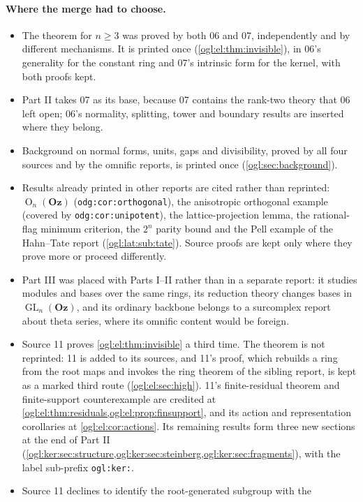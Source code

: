 \documentclass[11pt,oneside]{article}
\numberwithin{equation}{section}
\theoremstyle{definition}
\theoremstyle{remark}
\newcommand{\Oz}{\mathbf{Oz}}
\newcommand{\GL}{\operatorname{GL}}
\newcommand{\OO}{\operatorname{O}}
\newcommand{\replabel}[1]{\nolinkurl{#1}}
\begin{document}
\paragraph{Where the merge had to choose.}
\begin{itemize}[leftmargin=*]
\item The theorem for $n\ge3$ was proved by both 06 and 07, independently and
by different mechanisms. It is printed once (\cref{ogl:el:thm:invisible}), in
06's generality for the constant ring and 07's intrinsic form for the kernel,
with both proofs kept.
\item Part II takes 07 as its base, because 07 contains the rank-two theory
that 06 left open; 06's normality, splitting, tower and boundary results are
inserted where they belong.
\item Background on normal forms, units, gaps and divisibility, proved by all
four sources and by the omnific reports, is printed once
(\cref{ogl:sec:background}).
\item Results already printed in other reports are cited rather than
reprinted: $\OO_n(\Oz)$ (\replabel{odg:cor:orthogonal}), the anisotropic
orthogonal example (covered by \replabel{odg:cor:unipotent}), the
lattice-projection lemma, the rational-flag minimum criterion, the $2^n$
parity bound and the Pell example of the Hahn--Tate report
(\cref{ogl:lat:sub:tate}). Source proofs are kept only where they prove more
or proceed differently.
\item Part III was placed with Parts I--II rather than in a separate report:
it studies modules and bases over the same rings, its reduction theory changes
bases in $\GL_n(\Oz)$, and its ordinary backbone belongs to a surcomplex
report about theta series, where its omnific content would be foreign.
\item Source 11 proves \cref{ogl:el:thm:invisible} a third time. The theorem
is not reprinted: 11 is added to its sources, and 11's proof, which rebuilds
a ring from the root maps and invokes the ring theorem of the sibling report,
is kept as a marked third route (\cref{ogl:el:sec:high}). 11's finite-residual
theorem and finite-support counterexample are credited at
\cref{ogl:el:thm:residuals,ogl:el:prop:finsupport}, and its action and
representation corollaries at \cref{ogl:el:cor:actions}. Its remaining
results form three new sections at the end of Part II
(\cref{ogl:ker:sec:structure,ogl:ker:sec:steinberg,ogl:ker:sec:fragments}),
with the label sub-prefix \texttt{ogl:ker:}.
\item Source 11 declines to identify the root-generated subgroup with the

\end{itemize}
\end{document}

